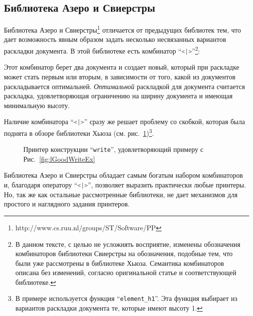 \subsection{Библиотека Азеро и Свиерстры}

Библиотека Азеро и Свиерстры\footnote{http://www.cs.ruu.nl/groups/ST/Software/PP} отличается от предыдущих библиотек тем, что дает возможность явным образом задать 
несколько несвязанных вариантов раскладки документа. В этой библиотеке есть комбинатор ``\lstinline[language=Haskell]{<|>}''\footnote{
В данном тексте, с целью не усложнять восприятие, изменены обозначения 
комбинаторов библиотеки Свиерстры на обозначения, подобные тем, что были уже рассмотрены в библиотеке Хьюза. Семантика комбинаторов описана без изменений, согласно оригинальной статье и соответствующей библиотеке.
}:



Этот комбинатор берет два документа и создает новый, который при раскладке может стать первым или вторым, в зависимости от того, какой из документов раскладывается оптимальней. \textit{Оптимальной} раскладкой для документа считается раскладка, удовлетворяющая ограничению на ширину документа и имеющая минимальную высоту.

Наличие комбинатора ``\lstinline[language=Haskell]{<|>}'' сразу же решает проблему со скобкой, которая была поднята в обзоре библиотеки Хьюза (см. рис.~\ref{fig:bracketSwierstra})\footnote{
	В примере используется функция ``\lstinline[language=Haskell]{element_h1}''. Эта функция выбирает из вариантов раскладки документа те, которые имеют высоту 1.
}.

\begin{figure}[h!]
	
	\caption{Принтер конструкции ``\lstinline{write}'', удовлетворяющий примеру с Рис.~\ref{fig:lGoodWriteEx}}
	\label{fig:bracketSwierstra}
\end{figure}


Библиотека Азеро и Свиерстры обладает самым богатым набором комбинаторов и, благодаря оператору ``\lstinline[language=Haskell]{<|>}'', позволяет выразить практически любые принтеры. Но, так же как остальные рассмотренные библиотеки, не дает механизмов для простого и наглядного задания принтеров.
